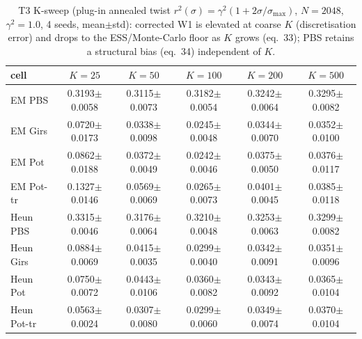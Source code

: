 \begin{table}[ht]
\centering
\caption{T3 K-sweep (plug-in annealed twist $r^2(\sigma)=\gamma^2(1+2\sigma/\sigma_{\max})$, $N=2048$, $\gamma^2=1.0$, 4 seeds, mean$\pm$std): corrected W1 is elevated at coarse $K$ (discretisation error) and drops to the ESS/Monte-Carlo floor as $K$ grows (eq.~33); PBS retains a structural bias (eq.~34) independent of $K$.}
\label{tab:toy_t3_k}
\begin{tabular}{lccccc}
\toprule
cell & $K=25$ & $K=50$ & $K=100$ & $K=200$ & $K=500$ \\
\midrule
EM PBS & 0.3193$\pm$0.0058 & 0.3115$\pm$0.0073 & 0.3182$\pm$0.0054 & 0.3242$\pm$0.0064 & 0.3295$\pm$0.0082 \\
EM Girs & 0.0720$\pm$0.0173 & 0.0338$\pm$0.0098 & 0.0245$\pm$0.0048 & 0.0344$\pm$0.0070 & 0.0352$\pm$0.0100 \\
EM Pot & 0.0862$\pm$0.0188 & 0.0372$\pm$0.0049 & 0.0242$\pm$0.0046 & 0.0375$\pm$0.0050 & 0.0376$\pm$0.0117 \\
EM Pot-tr & 0.1327$\pm$0.0146 & 0.0569$\pm$0.0069 & 0.0265$\pm$0.0073 & 0.0401$\pm$0.0045 & 0.0385$\pm$0.0118 \\
Heun PBS & 0.3315$\pm$0.0046 & 0.3176$\pm$0.0064 & 0.3210$\pm$0.0048 & 0.3253$\pm$0.0063 & 0.3299$\pm$0.0082 \\
Heun Girs & 0.0884$\pm$0.0069 & 0.0415$\pm$0.0035 & 0.0299$\pm$0.0040 & 0.0342$\pm$0.0091 & 0.0351$\pm$0.0096 \\
Heun Pot & 0.0750$\pm$0.0072 & 0.0443$\pm$0.0106 & 0.0360$\pm$0.0082 & 0.0343$\pm$0.0092 & 0.0365$\pm$0.0104 \\
Heun Pot-tr & 0.0563$\pm$0.0024 & 0.0307$\pm$0.0080 & 0.0299$\pm$0.0060 & 0.0349$\pm$0.0074 & 0.0370$\pm$0.0104 \\
\bottomrule
\end{tabular}
\end{table}
